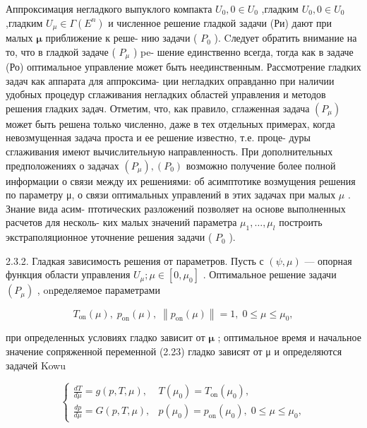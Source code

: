 \documentclass[10pt]{article}
\begin{document}
Аппроксимация негладкого выпуклого компакта \({U}_{0},0 \in  {U}_{0}\) ,гладким \({U}_{0},0 \in  {U}_{0}\) ,гладким \({U}_{\mu } \in  \Gamma \left( {E}^{n}\right)\) и численное решение гладкой задачи (Ри) дают при малых \(\mathbf{\mu }\) приближение к реше- нию задачи ( \({P}_{0}\) ). Cледует обратить внимание на то, что в гладкой задаче ( \({P}_{\mu }\) ) pe- шение единственно всегда, тогда как в задаче (Ро) оптимальное управление может быть неединственным. Рассмотрение гладких задач как аппарата для аппроксима- ции негладких оправданно при наличии удобных процедур сглаживания негладких областей управления и методов решения гладких задач. Отметим, что, как правило, сглаженная задача \(\left( {P}_{\mu }\right)\) может быть решена только численно, даже в тех отдельных примерах, когда невозмущенная задача проста и ее решение известно, т.е. проце- дуры сглаживания имеют вычислительную направленность. При дополнительных предположениях о задачах \(\left( {P}_{\mu }\right) ,\left( {P}_{0}\right)\) возможно получение более полной информации о связи между их решениями: об асимптотике возмущения решения по параметру μ, о связи оптимальных управлений в этих задачах при малых \(\mu\) . Знание вида асим- птотических разложений позволяет на основе выполненных расчетов для несколь- ких малых значений параметра \({\mu }_{1},\ldots ,{\mu }_{l}\) построить экстраполяционное уточнение решения задачи ( \({P}_{0}\) ).

2.3.2. Гладкая зависимость решения от параметров. Пусть с \(\left( {\psi ,\mu }\right)\) — опорная функция области управления \({U}_{\mu };\mu  \in  \left[  {0,{\mu }_{0}}\right]\) . Оптимальное решение задачи \(\left( {P}_{\mu }\right)\) , onределяемое параметрами

\[
{T}_{\mathrm{{on}}}\left( \mu \right) ,\;{p}_{\mathrm{{on}}}\left( \mu \right) ,\;\left\lVert {{p}_{\mathrm{{on}}}\left( \mu \right) } \right\rVert = 1,\;0 \leq  \mu  \leq  {\mu }_{0}, \tag{2.23}
\]

при определенных условиях гладко зависит от \(\mathbf{\mu }\) ; оптимальное время и начальное значение сопряженной переменной (2.23) гладко зависят от μ и определяются задачей Kowu

\[
\left\{  \begin{array}{ll} \frac{dT}{d\mu } = g\left( {p,T,\mu }\right) , & T\left( {\mu }_{0}\right)  = {T}_{\mathrm{{on}}}\left( {\mu }_{0}\right) , \\  \frac{dp}{d\mu } = G\left( {p,T,\mu }\right) , & p\left( {\mu }_{0}\right)  = {p}_{\mathrm{{on}}}\left( {\mu }_{0}\right) ,\;0 \leq  \mu  \leq  {\mu }_{0}, \end{array}\right. \tag{2.24}
\]
\end{document}
